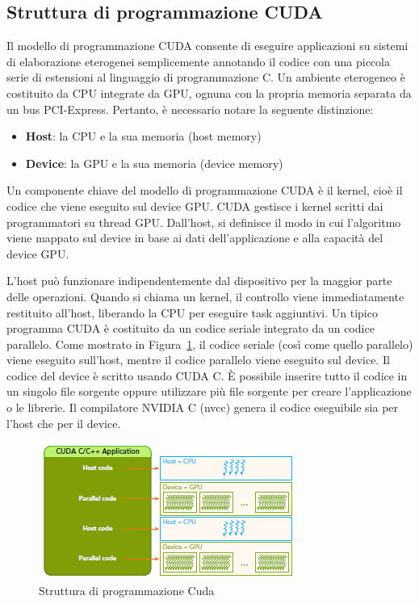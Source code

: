 \subsection{Struttura di programmazione CUDA}
Il modello di programmazione CUDA consente di eseguire applicazioni su sistemi di elaborazione eterogenei semplicemente annotando il codice con una piccola serie di estensioni al linguaggio di programmazione C. Un ambiente eterogeneo è costituito da CPU integrate da GPU, ognuna con la propria memoria separata da un bus PCI-Express. Pertanto, è necessario notare la seguente distinzione:
\begin{itemize}
	\item \textbf{Host}: la CPU e la sua memoria (host memory)
	\item \textbf{Device}: la GPU e la sua memoria (device memory)
\end{itemize}
Un componente chiave del modello di programmazione CUDA è il kernel, cioè il codice che viene eseguito sul device GPU. CUDA gestisce i kernel scritti dai programmatori su thread GPU. Dall'host, si definisce il modo in cui l'algoritmo viene mappato sul device in base ai dati dell'applicazione e alla capacità del device GPU. 

L'host può funzionare indipendentemente dal dispositivo per la maggior parte delle operazioni. Quando si chiama un kernel, il controllo viene immediatamente restituito all'host, liberando la CPU per eseguire task aggiuntivi. Un tipico programma CUDA è costituito da un codice seriale integrato da un codice parallelo. Come mostrato in Figura~\ref{fig:Cuda_programming_structure}, il codice seriale (così come quello parallelo) viene eseguito sull'host, mentre il codice parallelo viene eseguito sul device. Il codice del device è scritto usando CUDA C. È possibile inserire tutto il codice in un singolo file sorgente oppure utilizzare più file sorgente per creare l'applicazione o le librerie. Il compilatore NVIDIA C (nvcc) genera il codice eseguibile sia per l'host che per il device.
\begin{figure}[H]
	\centering
	\includegraphics[width=.75\textwidth]{Immagini/CUDA/Cuda_programming_structure}
	\caption{Struttura di programmazione Cuda \cite{Cheng:ProfessionalCudaProgramming}}
	\label{fig:Cuda_programming_structure}
\end{figure}

